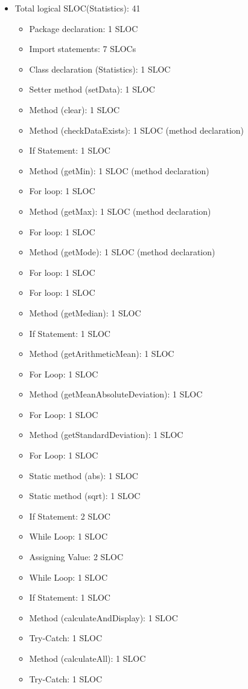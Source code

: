 \documentclass[12pt,letterpaper]{report}
\begin{document}
\begin{itemize}
     \item Total logical SLOC(Statistics): 41
     \\
    \begin{itemize}
    \item Package declaration: 1 SLOC
    \item Import statements: 7 SLOCs
    \item Class declaration (Statistics): 1 SLOC
    \item Setter method (setData): 1 SLOC
    \item Method (clear): 1 SLOC
    \item Method (checkDataExists): 1 SLOC (method declaration)
    \item If Statement: 1 SLOC
    \item Method (getMin): 1 SLOC (method declaration)
    \item For loop: 1 SLOC
    \item Method (getMax): 1 SLOC (method declaration)
    \item For loop: 1 SLOC
    \item Method (getMode): 1 SLOC (method declaration)
    \item For loop: 1 SLOC
    \item For loop: 1 SLOC
    \item Method (getMedian): 1 SLOC
    \item If Statement: 1 SLOC
    \item Method (getArithmeticMean): 1 SLOC
    \item For Loop: 1 SLOC
    \item Method (getMeanAbsoluteDeviation): 1 SLOC
    \item For Loop: 1 SLOC
    \item Method (getStandardDeviation): 1 SLOC
    \item For Loop: 1 SLOC
    \item Static method (abs): 1 SLOC
    \item Static method (sqrt): 1 SLOC
    \item If Statement: 2 SLOC
    \item While Loop: 1 SLOC
    \item Assigning Value: 2 SLOC
    \item While Loop: 1 SLOC
    \item If Statement: 1 SLOC
    \item Method (calculateAndDisplay): 1 SLOC
    \item Try-Catch: 1 SLOC
    \item Method (calculateAll): 1 SLOC
    \item Try-Catch: 1 SLOC
   \\
    \end{itemize}
\end{itemize}
\end{document}
